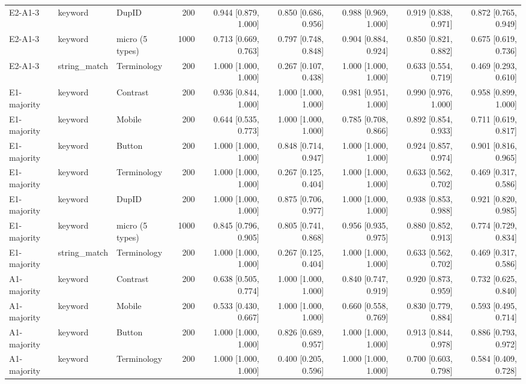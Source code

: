 \begin{table}[t]
\begin{tabular}{lllrrrrrr}
E2-A1-3 & keyword & DupID & 200 & 0.944 [0.879, 1.000] & 0.850 [0.686, 0.956] & 0.988 [0.969, 1.000] & 0.919 [0.838, 0.971] & 0.872 [0.765, 0.949] \\
E2-A1-3 & keyword & micro (5 types) & 1000 & 0.713 [0.669, 0.763] & 0.797 [0.748, 0.848] & 0.904 [0.884, 0.924] & 0.850 [0.821, 0.882] & 0.675 [0.619, 0.736] \\
E2-A1-3 & string\_match & Terminology & 200 & 1.000 [1.000, 1.000] & 0.267 [0.107, 0.438] & 1.000 [1.000, 1.000] & 0.633 [0.554, 0.719] & 0.469 [0.293, 0.610] \\
E1-majority & keyword & Contrast & 200 & 0.936 [0.844, 1.000] & 1.000 [1.000, 1.000] & 0.981 [0.951, 1.000] & 0.990 [0.976, 1.000] & 0.958 [0.899, 1.000] \\
E1-majority & keyword & Mobile & 200 & 0.644 [0.535, 0.773] & 1.000 [1.000, 1.000] & 0.785 [0.708, 0.866] & 0.892 [0.854, 0.933] & 0.711 [0.619, 0.817] \\
E1-majority & keyword & Button & 200 & 1.000 [1.000, 1.000] & 0.848 [0.714, 0.947] & 1.000 [1.000, 1.000] & 0.924 [0.857, 0.974] & 0.901 [0.816, 0.965] \\
E1-majority & keyword & Terminology & 200 & 1.000 [1.000, 1.000] & 0.267 [0.125, 0.404] & 1.000 [1.000, 1.000] & 0.633 [0.562, 0.702] & 0.469 [0.317, 0.586] \\
E1-majority & keyword & DupID & 200 & 1.000 [1.000, 1.000] & 0.875 [0.706, 0.977] & 1.000 [1.000, 1.000] & 0.938 [0.853, 0.988] & 0.921 [0.820, 0.985] \\
E1-majority & keyword & micro (5 types) & 1000 & 0.845 [0.796, 0.905] & 0.805 [0.741, 0.868] & 0.956 [0.935, 0.975] & 0.880 [0.852, 0.913] & 0.774 [0.729, 0.834] \\
E1-majority & string\_match & Terminology & 200 & 1.000 [1.000, 1.000] & 0.267 [0.125, 0.404] & 1.000 [1.000, 1.000] & 0.633 [0.562, 0.702] & 0.469 [0.317, 0.586] \\
A1-majority & keyword & Contrast & 200 & 0.638 [0.505, 0.774] & 1.000 [1.000, 1.000] & 0.840 [0.747, 0.919] & 0.920 [0.873, 0.959] & 0.732 [0.625, 0.840] \\
A1-majority & keyword & Mobile & 200 & 0.533 [0.430, 0.667] & 1.000 [1.000, 1.000] & 0.660 [0.558, 0.769] & 0.830 [0.779, 0.884] & 0.593 [0.495, 0.714] \\
A1-majority & keyword & Button & 200 & 1.000 [1.000, 1.000] & 0.826 [0.689, 0.957] & 1.000 [1.000, 1.000] & 0.913 [0.844, 0.978] & 0.886 [0.793, 0.972] \\
A1-majority & keyword & Terminology & 200 & 1.000 [1.000, 1.000] & 0.400 [0.205, 0.596] & 1.000 [1.000, 1.000] & 0.700 [0.603, 0.798] & 0.584 [0.409, 0.728] \\

\end{tabular}
\end{table}

